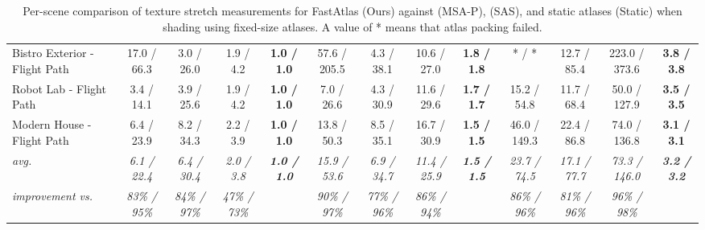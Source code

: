 \begin{table*}[t]
\begin{tabular}{l cccc|cccc|cccc}
		Bistro Exterior - Flight Path & 17.0 / 66.3          & 3.0 / 26.0           & 1.9 / 4.2            & \textbf{1.0 / 1.0}   & 57.6 / 205.5         & 4.3 / 38.1           & 10.6 / 27.0          & \textbf{1.8 / 1.8}   & * / *                & 12.7 / 85.4          & 223.0 / 373.6        & \textbf{3.8 / 3.8}   \\
		Robot Lab - Flight Path       & 3.4 / 14.1           & 3.9 / 25.6           & 1.9 / 4.2            & \textbf{1.0 / 1.0}   & 7.0 / 26.6           & 4.3 / 30.9           & 11.6 / 29.6          & \textbf{1.7 / 1.7}   & 15.2 / 54.8          & 11.7 / 68.4          & 50.0 / 127.9         & \textbf{3.5 / 3.5}   \\
		Modern House - Flight Path    & 6.4 / 23.9           & 8.2 / 34.3           & 2.2 / 3.9            & \textbf{1.0 / 1.0}   & 13.8 / 50.3          & 8.5 / 35.1           & 16.7 / 30.9          & \textbf{1.5 / 1.5}   & 46.0 / 149.3         & 22.4 / 86.8          & 74.0 / 136.8         & \textbf{3.1 / 3.1}   \\
		\hline
		\textit{avg.}                 & \textit{6.1 / 22.4}  & \textit{6.4 / 30.4}  & \textit{2.0 / 3.8}   & \textit{\textbf{1.0 / 1.0}} & \textit{15.9 / 53.6} & \textit{6.9 / 34.7}  & \textit{11.4 / 25.9} & \textit{\textbf{1.5 / 1.5}} & \textit{23.7 / 74.5} & \textit{17.1 / 77.7} & \textit{73.3 / 146.0} & \textit{\textbf{3.2 / 3.2}} \\
		\textit{improvement vs.}      & \textit{83\% / 95\%} & \textit{84\% / 97\%} & \textit{47\% / 73\%} & \textit{}                   & \textit{90\% / 97\%} & \textit{77\% / 96\%} & \textit{86\% / 94\%} & \textit{}                   & \textit{86\% / 96\%} & \textit{81\% / 96\%} & \textit{96\% / 98\%}  &  \\                          
	\end{tabular}
	\vspace{1mm}
	\caption{Per-scene comparison of texture stretch measurements for FastAtlas (Ours) against \cite{Neff2022MSA} (MSA-P), \cite{mueller2018shading} (SAS), and static atlases (Static) when shading using fixed-size atlases. A value of * means that atlas packing failed.}
	\label{tab:supp_texture_stretch_fixed_atlas}
	\vspace{-3mm}
\end{table*}
